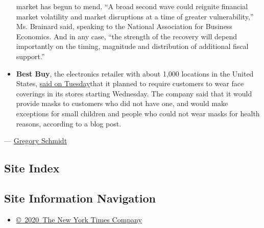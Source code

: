 \begin{itemize}
  market has begun to mend. ``A broad second wave could reignite
  financial market volatility and market disruptions at a time of
  greater vulnerability,'' Ms. Brainard said, speaking to the National
  Association for Business Economics. And in any case, ``the strength of
  the recovery will depend importantly on the timing, magnitude and
  distribution of additional fiscal support.''
\item
  \textbf{Best Buy}, the electronics retailer with about 1,000 locations
  in the United States,
  \href{https://corporate.bestbuy.com/best-buy-now-requiring-face-coverings-for-store-customers/}{said
  on Tuesday}that it planned to require customers to wear face coverings
  in its stores starting Wednesday. The company said that it would
  provide masks to customers who did not have one, and would make
  exceptions for small children and people who could not wear masks for
  health reasons, according to a blog post.
\end{itemize}

--- \href{https://www.nytimes.com/by/gregory-schmidt}{Gregory Schmidt}

\hypertarget{site-index}{%
\subsection{Site Index}\label{site-index}}

\hypertarget{site-information-navigation}{%
\subsection{Site Information
Navigation}\label{site-information-navigation}}

\begin{itemize}
\tightlist
\item
  \href{https://help.nytimes.com/hc/en-us/articles/115014792127-Copyright-notice}{©~2020~The
  New York Times Company}
\end{itemize}

